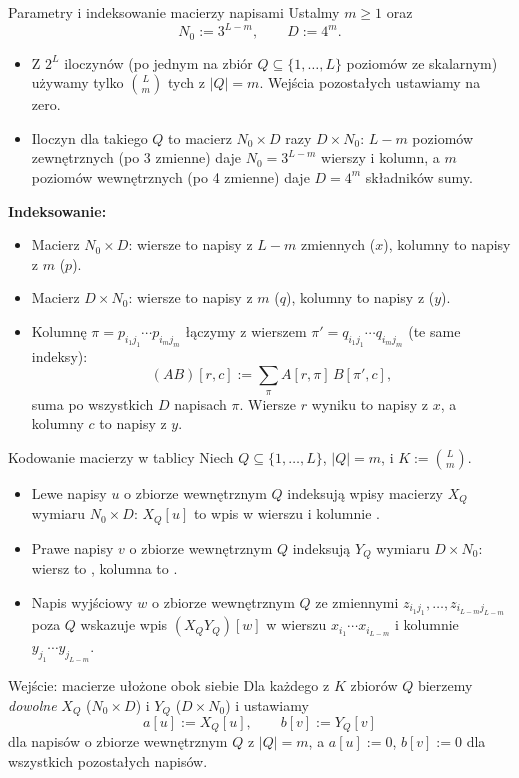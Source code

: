 \begin{frame}{Parametry i indeksowanie macierzy napisami}
  \small
  Ustalmy $m\ge1$ oraz
  \[
    N_0:=3^{L-m},\qquad D:=4^m.
  \]
  \begin{itemize}
    \item Z $2^L$ iloczynów (po jednym na zbiór $Q\subseteq\{1,\dots,L\}$ poziomów ze skalarnym) używamy tylko
      $\binom Lm$ tych z $|Q|=m$. Wejścia pozostałych ustawiamy na zero.
    \item Iloczyn dla takiego $Q$ to macierz $N_0\times D$ razy $D\times N_0$: $L-m$ poziomów zewnętrznych
      (po 3 zmienne) daje $N_0=3^{L-m}$ wierszy i kolumn, a $m$ poziomów wewnętrznych (po 4 zmienne) daje
      $D=4^m$ składników sumy.
  \end{itemize}
  \pause
  \small
  \textbf{Indeksowanie:}
  \begin{itemize}
    \item Macierz $N_0\times D$: wiersze to napisy z $L-m$  zmiennych ($x$),
      kolumny to napisy z $m$  ($p$).
    \item Macierz $D\times N_0$: wiersze to napisy z $m$  ($q$),
      kolumny to napisy z  ($y$).
    \item Kolumnę $\pi=p_{i_1j_1}\cdots p_{i_mj_m}$ łączymy z wierszem $\pi'=q_{i_1j_1}\cdots q_{i_mj_m}$
      (te same indeksy):
      \[
        (AB)[r,c]:=\sum_\pi A[r,\pi]\,B[\pi',c],
      \]
      suma po wszystkich $D$ napisach $\pi$. Wiersze $r$ wyniku to napisy z $x$, a kolumny $c$ to napisy z $y$.
  \end{itemize}
\end{frame}

\begin{frame}{Kodowanie macierzy w tablicy}
  Niech $Q\subseteq\{1,\dots,L\}$, $|Q|=m$, i $K:=\binom Lm$.
  \begin{itemize}
    \item Lewe napisy $u$ o zbiorze wewnętrznym $Q$ indeksują wpisy macierzy $X_Q$ wymiaru $N_0\times D$:
      $X_Q[u]$ to wpis w wierszu  i kolumnie .
    \item Prawe napisy $v$ o zbiorze wewnętrznym $Q$ indeksują $Y_Q$ wymiaru $D\times N_0$: wiersz to , kolumna to .
    \item Napis wyjściowy $w$ o zbiorze wewnętrznym $Q$ ze zmiennymi $z_{i_1j_1},\dots,z_{i_{L-m}j_{L-m}}$ poza $Q$ wskazuje
      wpis $(X_QY_Q)[w]$ w wierszu $x_{i_1}\cdots x_{i_{L-m}}$ i kolumnie $y_{j_1}\cdots y_{j_{L-m}}$.
  \end{itemize}
  \pause
  \begin{block}{Wejście: macierze ułożone obok siebie}
    Dla każdego z $K$ zbiorów $Q$ bierzemy \emph{dowolne} $X_Q$ ($N_0\times D$) i $Y_Q$ ($D\times N_0$) i ustawiamy
    \[
      a[u]:=X_Q[u],\qquad b[v]:=Y_Q[v]
    \]
    dla napisów o zbiorze wewnętrznym $Q$ z $|Q|=m$, a $a[u]:=0$, $b[v]:=0$ dla wszystkich pozostałych napisów.
  \end{block}
\end{frame}

